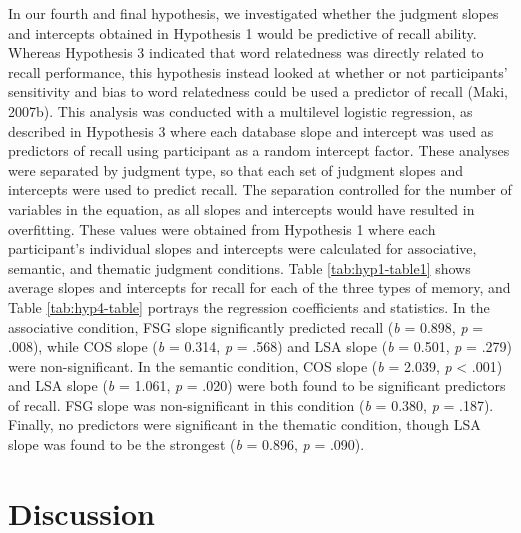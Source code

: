 \documentclass[english,man]{apa6}
\theoremstyle{definition}
\theoremstyle{definition}
\theoremstyle{remark}
\begin{document}
In our fourth and final hypothesis, we investigated whether the judgment
slopes and intercepts obtained in Hypothesis 1 would be predictive of
recall ability. Whereas Hypothesis 3 indicated that word relatedness was
directly related to recall performance, this hypothesis instead looked
at whether or not participants' sensitivity and bias to word relatedness
could be used a predictor of recall (Maki, 2007b). This analysis was
conducted with a multilevel logistic regression, as described in
Hypothesis 3 where each database slope and intercept was used as
predictors of recall using participant as a random intercept factor.
These analyses were separated by judgment type, so that each set of
judgment slopes and intercepts were used to predict recall. The
separation controlled for the number of variables in the equation, as
all slopes and intercepts would have resulted in overfitting. These
values were obtained from Hypothesis 1 where each participant's
individual slopes and intercepts were calculated for associative,
semantic, and thematic judgment conditions. Table \ref{tab:hyp1-table1}
shows average slopes and intercepts for recall for each of the three
types of memory, and Table \ref{tab:hyp4-table} portrays the regression
coefficients and statistics. In the associative condition, FSG slope
significantly predicted recall (\emph{b} = 0.898, \emph{p} = .008),
while COS slope (\emph{b} = 0.314, \emph{p} = .568) and LSA slope
(\emph{b} = 0.501, \emph{p} = .279) were non-significant. In the
semantic condition, COS slope (\emph{b} = 2.039, \emph{p} \textless{}
.001) and LSA slope (\emph{b} = 1.061, \emph{p} = .020) were both found
to be significant predictors of recall. FSG slope was non-significant in
this condition (\emph{b} = 0.380, \emph{p} = .187). Finally, no
predictors were significant in the thematic condition, though LSA slope
was found to be the strongest (\emph{b} = 0.896, \emph{p} = .090).

\section{Discussion}\label{discussion}
\end{document}
